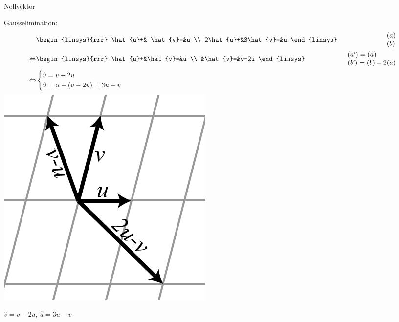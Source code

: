 \begin{task}{2.2}
	\ans Nollvektor
\end{task}

\pagebreak
\begin{task}{2.3}
	Gausselimination:
	\begin{align*}
		&\begin{linsys}{rrr}
			 \hat{u}+& \hat{v}=&u \\
			2\hat{u}+&3\hat{v}=&u
		\end{linsys}
		&\begin{array}{l}
			(a) \\
			(b)
		\end{array} \\ \lra
		&\begin{linsys}{rrr}
			\hat{u}+&\hat{v}=&u \\
			        &\hat{v}=&v-2u
		\end{linsys}
		&\begin{array}{l}
		(a')=(a) \\
		(b')=(b)-2(a)
		\end{array} \\ \lra
		&\begin{cases}
		\hat{v}=v-2u \\
		\hat{u}=u-(v-2u)=3u-v
		\end{cases}
	\end{align*}
	\includegraphics[scale=0.3]{images/23.PNG}
	
	\ans $\hat{v}=v-2u$, $\hat{u}=3u-v$
\end{task}

